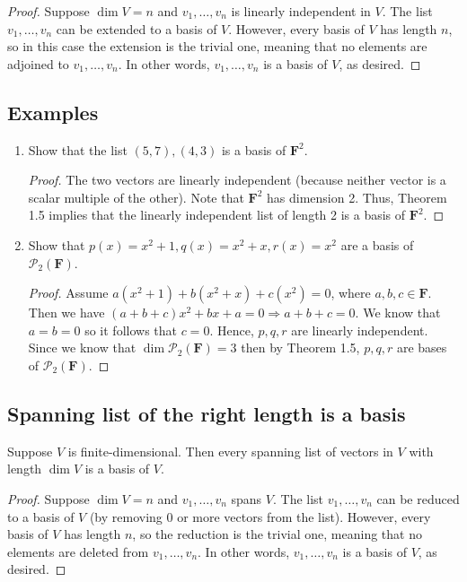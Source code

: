 \documentclass[11pt]{article}
\begin{document}
    \begin{proof}
        Suppose \(\dim V = n\) and \(v_1, \dots, v_n\) is linearly independent in $V$. The list \(v_1, \dots, v_n\) can be extended to a basis of $V$. However, every basis of $V$ has length $n$, so in this case the extension is the trivial one, meaning that no elements are adjoined to \(v_1, \dots, v_n\). In other words, \(v_1, \dots, v_n\) is a basis of $V$, as desired.
    \end{proof}

    \subsection{Examples}

    \begin{enumerate}
        \item Show that the list \((5,7), (4,3)\) is a basis of \(\textbf{F}^2\). 
        \begin{proof}
            The two vectors are linearly independent (because neither vector is a scalar multiple of the other). Note that \(\textbf{F}^2\) has dimension 2. Thus, Theorem 1.5 implies that the linearly independent list of length 2 is a basis of \(\textbf{F}^2\).
        \end{proof}
        \item Show that \(p(x) = x^2 + 1, q(x) = x^2 + x, r(x) = x^2\) are a basis of \(\mathcal{P}_2(\textbf{F})\).
        \begin{proof}
            Assume \(a(x^2 + 1) + b(x^2 + x) + c(x^2) = 0\), where \(a,b,c \in \textbf{F}\). Then we have \((a + b + c)x^2 + bx + a = 0 \Rightarrow a + b + c = 0.\) We know that \(a = b = 0\) so it follows that \(c = 0\). Hence, $p,q,r$ are linearly independent. Since we know that \(\dim \mathcal{P}_2(\textbf{F}) = 3\) then by Theorem 1.5, $p,q,r$ are bases of \(\mathcal{P}_2(\textbf{F})\).
        \end{proof}
    \end{enumerate}

    \subsection{Spanning list of the right length is a basis}

    Suppose $V$ is finite-dimensional. Then every spanning list of vectors in $V$ with length \(\dim V\) is a basis of $V$.

    \begin{proof}
        Suppose \(\dim V = n\) and \(v_1, \dots, v_n\) spans $V$. The list \(v_1, \dots, v_n\) can be reduced to a basis of $V$ (by removing 0 or more vectors from the list). However, every basis of $V$ has length $n$, so the reduction is the trivial one, meaning that no elements are deleted from \(v_1, \dots, v_n\). In other words, \(v_1, \dots, v_n\) is a basis of $V$, as desired.
    \end{proof}
\end{document}
